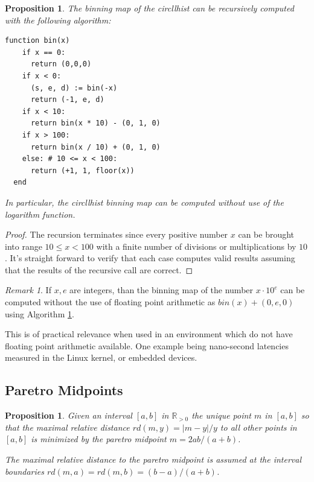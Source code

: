 \documentclass{article}
\theoremstyle{plain}
\newtheorem{proposition}[definition]{Proposition}
\theoremstyle{remark}
\newtheorem{remark}[definition]{Remark}
\newcommand{\IR}{\mathbb{R}}
\begin{document}
\begin{proposition} \label{prop:rec}
  The binning map of the circllhist can be recursively computed with the following algorithm:

\begin{BVerbatim}[fontfamily=tt]
  function bin(x)
    if x == 0:
      return (0,0,0)
    if x < 0:
      (s, e, d) := bin(-x)
      return (-1, e, d)
    if x < 10:
      return bin(x * 10) - (0, 1, 0)
    if x > 100:
      return bin(x / 10) + (0, 1, 0)
    else: # 10 <= x < 100:
      return (+1, 1, floor(x))
  end
\end{BVerbatim}

In particular, the circllhist binning map can be computed without use of the logarithm function.
\end{proposition}

\begin{proof}
  The recursion terminates since every positive number $x$ can be brought into range $10 \leq x <
  100$ with a finite number of divisions or multiplications by $10$.  It's straight forward to
  verify that each case computes valid results assuming that the results of the recursive call are
  correct.
\end{proof}

\begin{remark}
  If $x,e$ are integers, than the binning map of the number $x \cdot 10^{e}$ can be computed without
  the use of floating point arithmetic as $bin(x) + (0,e,0)$ using Algorithm \ref{prop:rec}.

  This is of practical relevance when used in an environment which do not have floating
  point arithmetic available. One example being nano-second latencies measured in the Linux kernel,
  or embedded devices.
\end{remark}

\subsection{Paretro Midpoints}

\begin{proposition} \label{prop:pdist}
  Given an interval $[a,b]$ in $\IR_{>0}$ the unique point $m$ in $[a,b]$ so that the maximal
  relative distance $rd(m, y) = |m-y|/y$ to all other points in $[a,b]$ is minimized
  by the paretro midpoint
  $m = 2ab / (a + b)$.

  The maximal relative distance to the paretro midpoint is assumed at the interval boundaries
  $rd(m,a) = rd(m,b) = (b - a) / (a + b)$.
\end{proposition}
\end{document}
